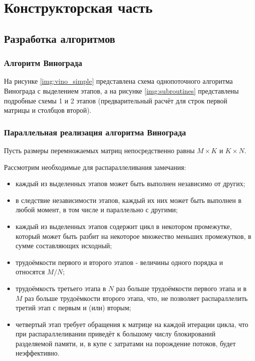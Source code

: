 \chapter{Конструкторская часть}

\section{Разработка алгоритмов}

\subsection{Алгоритм Винограда}

На рисунке \ref{img:vino_simple} представлена схема однопоточного алгоритма Винограда с выделением этапов, а на рисунке \ref{img:subroutines} представлены подробные схемы 1 и 2 этапов (предварительный расчёт для строк первой матрицы и столбцов второй).

\clearpage
{}
\clearpage

\subsection{Параллельная реализация алгоритма Винограда}


Пусть размеры перемножаемых матриц непосредственно равны $M \times K$ и $K \times N$.

Рассмотрим необходимые для распараллеливания замечания:
\begin{itemize}
    \item каждый из выделенных этапов может быть выполнен независимо от других;
    \item в следствие независимости этапов, каждый их них может быть выполнен в любой момент, в том числе и параллельно с другими;
    \item каждый из выделенных этапов содержит цикл в некотором промежутке, который может быть разбит на некоторое множество меньших промежутков, в сумме составляющих исходный;
    \item трудоёмкости первого и второго этапов - величины одного порядка и относятся $M / N$;
    \item трудоёмкость третьего этапа в $N$ раз больше трудоёмкости первого этапа и в $M$ раз больше трудоёмкости второго этапа, что, не позволяет распараллелить третий этап с первым и (или) вторым;
    \item четвертый этап требует обращения к матрице на каждой итерации цикла, что при распараллеливании приведёт к большому числу блокирований разделяемой памяти, и, в купе с затратами на порождение потоков, будет неэффективно.
\end{itemize}
\clearpage

